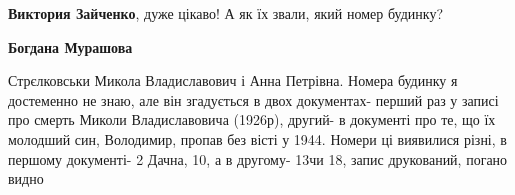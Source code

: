 \begin{itemize}
\begin{itemize} %
\textbf{Виктория Зайченко}, дуже цікаво! А як їх звали, який номер будинку?

\textbf{Богдана Мурашова} 

Стрєлковськи Микола Владиславович і Анна Петрівна. Номера будинку я достеменно
не знаю, але він згадується в двох документах- перший раз у записі про смерть
Миколи Владиславовича (1926р), другий- в документі про те, що їх молодший син,
Володимир, пропав без вісті у 1944. Номери ці виявилися різні, в першому
документі- 2 Дачна, 10, а в другому- 13чи 18, запис друкований, погано видно

\end{itemize} %

\end{itemize} %

